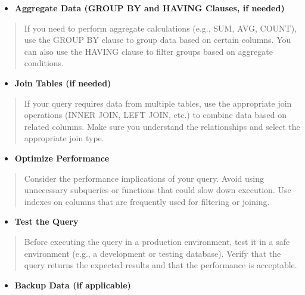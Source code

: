 \documentclass[
]{book}
\providecommand{\tightlist}{%
  \setlength{\itemsep}{0pt}\setlength{\parskip}{0pt}}
\begin{document}
\begin{itemize}
\tightlist
\item
  \textbf{Aggregate Data (GROUP BY and HAVING Clauses, if needed)}
\end{itemize}

\begin{quote}
If you need to perform aggregate calculations (e.g., SUM, AVG, COUNT), use the GROUP BY clause to group data based on certain columns. You can also use the HAVING clause to filter groups based on aggregate conditions.
\end{quote}

\begin{itemize}
\tightlist
\item
  \textbf{Join Tables (if needed)}
\end{itemize}

\begin{quote}
If your query requires data from multiple tables, use the appropriate join operations (INNER JOIN, LEFT JOIN, etc.) to combine data based on related columns. Make sure you understand the relationships and select the appropriate join type.
\end{quote}

\begin{itemize}
\tightlist
\item
  \textbf{Optimize Performance}
\end{itemize}

\begin{quote}
Consider the performance implications of your query. Avoid using unnecessary subqueries or functions that could slow down execution. Use indexes on columns that are frequently used for filtering or joining.
\end{quote}

\begin{itemize}
\tightlist
\item
  \textbf{Test the Query}
\end{itemize}

\begin{quote}
Before executing the query in a production environment, test it in a safe environment (e.g., a development or testing database). Verify that the query returns the expected results and that the performance is acceptable.
\end{quote}

\begin{itemize}
\tightlist
\item
  \textbf{Backup Data (if applicable)}
\end{itemize}
\end{document}
